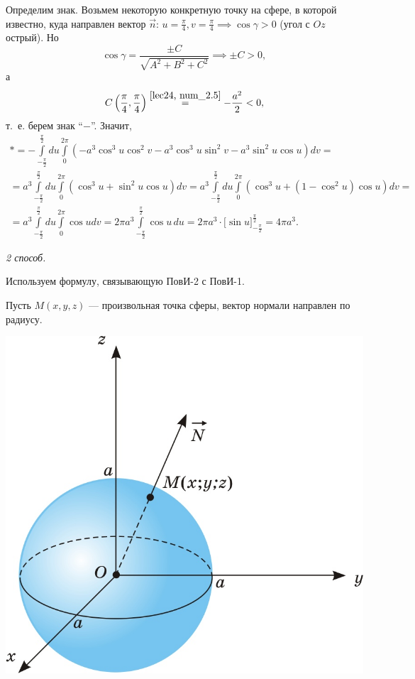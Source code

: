 \documentclass[../../main.tex]{subfiles}
\begin{document}
\begin{example}
	Определим знак. Возьмем некоторую конкретную точку на сфере, в которой 
	известно, куда направлен вектор $\vec{n}$: $u=\frac{\pi}{4}, v=\frac{\pi}{4}
	\implies \cos\gamma > 0$ (угол с $Oz$ острый). Но \[\cos\gamma = 
	\dfrac{\pm C}{\sqrt{A^2 + B^2 + C^2}}\implies \pm C>0,\] а \[C\left(\frac{\pi}
	{4}, \frac{\pi}{4}\right)\stk{lec24, num_2.5}{=}-\frac{a^2}{2}<0,\] т.~е. 
	берем
	 знак ``$-$''. Значит,
	\begin{gather*}*=-\int\limits_{-\frac{\pi}{2}}^{\frac{\pi}{2}}du\int
	\limits_0^{2\pi}(-a^3\cos^3 u \cos^2 v - a^3\cos^3 u \sin^2 v - a^3\sin^2
	 u \cos u)dv =\\= a^3 \int\limits_{-\frac{\pi}{2}}^{\frac{\pi}{2}}du\int
	 \limits_0^{2\pi}(\cos^3 u + \sin^2 u \cos u)dv = a^3 \int\limits_{-\frac
	 	{\pi}{2}}^{\frac{\pi}{2}}du\int\limits_0^{2\pi}(\cos^3 u + (1-\cos^2 u)
 	 \cos u)dv = \\ = a^3 \int\limits_{-\frac{\pi}{2}}^{\frac{\pi}{2}}du\int
 	 \limits_0^{2\pi}\cos u dv =
 	 2\pi a^3 \int\limits_{-\frac{\pi}{2}}^{\frac{\pi}{2}}\cos u\,du
 	 = 2\pi a^3 \cdot\Big[\sin u\Big]_{-\frac\pi2}^{\frac\pi2}
 	 = 4\pi a^3.
 	 \end{gather*}
	
	\noindent\emph{2 способ.}
	
	Используем формулу, связывающую ПовИ-2 с ПовИ-1.
		
	Пусть $M(x, y, z)$ --- произвольная точка сферы, вектор нормали направлен 
	по радиусу.
	
	\begin{center}
		\includegraphics[scale = 0.27]{lec24_1.jpg}
	\end{center}
	

\end{example}
\end{document}
